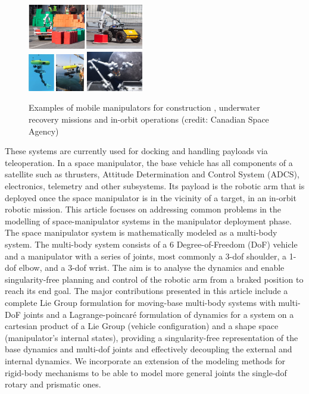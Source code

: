 \documentclass[lettersize,journal]{IEEEtran}
\theoremstyle{remark}
\begin{document}
\begin{figure}
    \centering
    \includegraphics[width=0.45\textwidth]{building.png}\hfill\\[\smallskipamount]
    
    \includegraphics[width=0.22\textwidth]{Girona-500-I-AUV-Left-TRIDENT-configuration-Middle-RAUVI-TRITON-configuration.ppm.png}
    \includegraphics[width=0.22\textwidth]{CanadarmFriend.jpg}
    \caption{Examples of mobile manipulators for construction \cite{vstibinger2021mobile}, underwater recovery missions \cite{ribas2011girona} and in-orbit operations (credit: Canadian Space Agency)}
    \label{fig:bulding}
\end{figure}
These systems are currently used for docking and handling payloads via teleoperation\cite{gibbs2002canada,king2001space, aikenhead1983canadarm}. 
In a space manipulator, the base vehicle has all components of a satellite such as thrusters, Attitude Determination and Control System (ADCS), electronics, telemetry and other subsystems. Its payload is the robotic arm that is deployed once the space manipulator is in the vicinity of a target, in an in-orbit robotic mission.
This article focuses on addressing common problems in the modelling of space-manipulator systems in the manipulator deployment phase. The space manipulator system is mathematically modeled as a multi-body system. The multi-body system consists of a 6 Degree-of-Freedom (DoF) vehicle and a manipulator with a series of joints, most commonly a 3-dof shoulder, a 1-dof elbow, and a 3-dof wrist.
The aim is to analyse the dynamics and enable singularity-free planning and control of the robotic arm from a braked position to reach its end goal. 
The major contributions presented in this article include a complete Lie Group formulation for moving-base multi-body systems with multi-DoF joints and a Lagrange-poincar\'{e} formulation of dynamics for a system on a cartesian product of a Lie Group (vehicle configuration) and a shape space (manipulator's internal states), providing a singularity-free representation of the base dynamics and multi-dof joints and effectively decoupling the external and internal dynamics\cite{park1995lie}. We incorporate an extension of the modeling methods for rigid-body mechanisms to be able to model more general joints the single-dof rotary and prismatic ones. 
\end{document}
